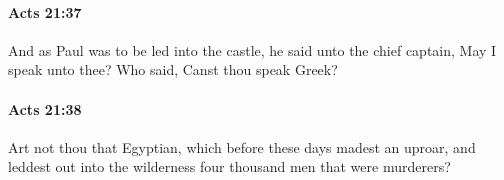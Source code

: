 		\paragraph{Acts 21:37} %
			\label{ACTS-21-37}

			And as Paul was to be led into the castle, he said unto the chief captain, May I speak unto thee?  Who said, Canst thou speak Greek?

			\begin{framed}
			\scriptsize
				\begin{compactdesc}
					\item[SBLG] 
				\end{compactdesc}
			\end{framed}

		\paragraph{Acts 21:38} %
			\label{ACTS-21-38}

			Art not thou that Egyptian, which before these days madest an uproar, and leddest out into the wilderness four thousand men that were murderers?

